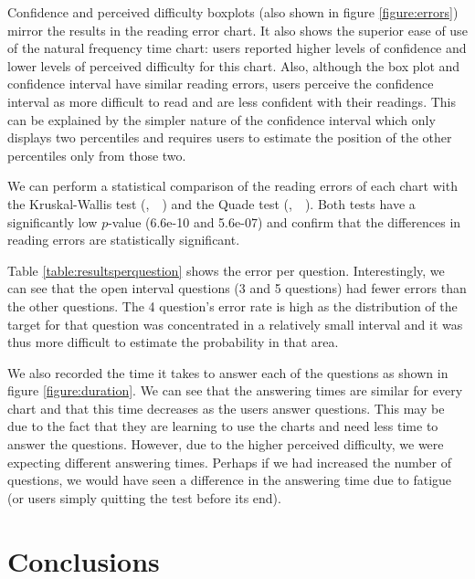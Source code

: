 \documentclass[a4paper,3p,sort&compress]{elsarticle}
\DeclareRobustCommand{\citeext}[1]{\citeauthor{#1},~\citeyear{#1}~\cite{#1}}
\begin{document}
Confidence and perceived difficulty boxplots (also shown in figure
\ref{figure:errors}) mirror the results in the reading error chart. It also
shows the superior ease of use of the natural frequency time chart: users
reported higher levels of confidence and lower levels of perceived difficulty
for this chart. Also, although the box plot and confidence interval have similar
reading errors, users perceive the confidence interval as more difficult to read
and are less confident with their readings. This can be explained by the simpler
nature of the confidence interval which only displays two percentiles and
requires users to estimate the position of the other percentiles only from those
two.

We can perform a statistical comparison of the reading errors of each chart with
the Kruskal-Wallis test (\citeext{krustal}) 
and the Quade test (\citeext{quade_rank_1967}). 
Both tests have a significantly low $p$-value (6.6e-10
and 5.6e-07) and confirm that the differences in reading errors are
statistically significant.

Table \ref{table:resultsperquestion} shows the error per question.
Interestingly, we can see that the open interval questions (3 and
5 questions) had fewer errors than the other questions. The 4
question's error rate is high as the distribution of the target for that
question was concentrated in a relatively small interval and it was thus more
difficult to estimate the probability in that area.

We also recorded the time it takes to answer each of the questions as shown in
figure \ref{figure:duration}. We can see that the answering times are similar
for every chart and that this time decreases as the users answer questions. This
may be due to the fact that they are learning to use the charts and need less
time to answer the questions. However, due to the higher perceived difficulty,
we were expecting different answering times. Perhaps if we had increased the
number of questions, we would have seen a difference in the answering time due
to fatigue (or users simply quitting the test before its end).

\section{Conclusions}
\label{sec:concl}
\end{document}
